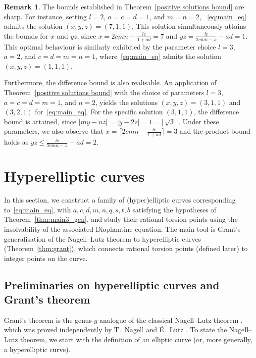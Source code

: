 \documentclass[11pt,a4paper]{amsart}
\theoremstyle{plain}
\theoremstyle{definition}
\newtheorem{remark}[theorem]{Remark}
\begin{document}
\begin{remark}
The bounds established in Theorem~\ref{positive solutions bound} are sharp. For instance, setting $l=2$, $a=c=d=1$, and $m=n=2$, ~\eqref{eq:main_eq} admits the solution $(x,y,z) = (7,1,1)$. This solution simultaneously attains the bounds for $x$ and $yz$, since $x = 2cmn - \frac{lc}{1+ad} = 7$ and $yz = \frac{lc}{2cmn-x} - ad = 1$. This optimal behaviour  is similarly exhibited by the parameter choice $l=3$, $a=2$, and $c=d=m=n=1$, where~\eqref{eq:main_eq} admits the solution $(x,y,z) = (1,1,1)$.

Furthermore, the difference bound is also realisable. An application of Theorem~\ref{positive solutions bound} with the choice of parameters $l=3$, $a=c=d=m=1$, and $n=2$, yields the solutions $(x,y,z) = (3,1,1)$ and $(3,2,1)$ for~\eqref{eq:main_eq}. For the specific solution $(3,1,1)$, the difference bound is attained, since $|my-nz| = |y-2z| = 1 = \lfloor\sqrt{3}\rfloor$. Under these parameters, we also observe that $x = \big\lceil 2cmn - \frac{lc}{1+ad} \big\rceil =3$ and the product bound holds as $yz \le \frac{lc}{2cmn-x} - ad = 2$.
\end{remark}

\section{Hyperelliptic curves}\label{sec:hyperelliptic}
In this section, we construct a family of (hyper)elliptic curves corresponding to~\eqref{eq:main_eq}, with  $a,c,d,m,n,q,s,t,b$ satisfying the hypotheses of Theorem~\ref{thm:main3_gen}, and study their rational torsion points using the insolvability of the associated Diophantine equation. The main tool is Grant's generalisation of the Nagell--Lutz theorem to hyperelliptic curves (Theorem~\ref{thm:grant}), which connects rational torsion points (defined later) to integer points on the curve. \subsection{Preliminaries on hyperelliptic curves and Grant's theorem}\label{subsec:hyper-preliminaries}
Grant's theorem \cite[Theorem~3]{Grant} is the genus-$g$ analogue of the classical Nagell--Lutz theorem \cite[Theorem~2.5, Remark~2.6]{SilvermanTate2015}, which was proved independently by T.\ Nagell \cite{Nagell1935} and \'E.\ Lutz \cite{Lutz1937}. To state the Nagell--Lutz theorem, we start with the definition of an elliptic curve (or, more generally, a hyperelliptic curve).
\end{document}
